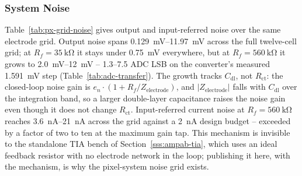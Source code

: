 %

\subsubsection{System Noise}\label{sss:pixel-noise}

Table~\ref{tab:px-grid-noise} gives output and input-referred noise over the
same electrode grid. Output noise spans \SIrange{0.129}{11.97}{\milli\volt}
across the full twelve-cell grid; at $R_f = \SI{35}{\kilo\ohm}$ it stays under
\SI{0.75}{\milli\volt} everywhere, but at $R_f = \SI{560}{\kilo\ohm}$ it grows
to \SIrange{2.0}{12}{\milli\volt} -- \numrange{1.3}{7.5} ADC LSB on the
converter's measured \SI{1.591}{\milli\volt} step
(Table~\ref{tab:adc-transfer}). The growth
tracks $C_{\mathrm{dl}}$, not $R_{\mathrm{ct}}$: the closed-loop noise gain is
$e_n\cdot(1 + R_f/Z_{\mathrm{electrode}})$, and $\lvert Z_{\mathrm{electrode}}
\rvert$ falls with $C_{\mathrm{dl}}$ over the integration band, so a larger
double-layer capacitance raises the noise gain even though it does not change
$R_{\mathrm{ct}}$. Input-referred current noise at $R_f =
\SI{560}{\kilo\ohm}$ reaches \SIrange{3.6}{21}{\nano\ampere} across the grid
against a \SI{2}{\nano\ampere} design budget -- exceeded by a factor of two to
ten at the maximum gain tap. This mechanism is invisible to the standalone TIA
bench of Section~\ref{sss:ampab-tia}, which uses an ideal feedback resistor
with no electrode network in the loop; publishing it here, with the
mechanism, is why the pixel-system noise grid exists.

